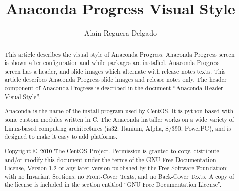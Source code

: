 \documentclass[12pt]{article}
\title{Anaconda Progress Visual Style}
\author{Alain Reguera Delgado}
\begin{document}
\maketitle

\begin{abstract}

This article describes the visual style of Anaconda Progress.
Anaconda Progress screen is shown after configuration and while
packages are installed. Anaconda Progress screen has a header, and
slide images which alternate with release notes texts.  This article
describes Anaconda Progress slide images and release notes only.  The
header component of Anaconda Progress is described in the document
``Anaconda Header Visual Style''.

Anaconda is the name of the install program used by CentOS.  It is
python-based with some custom modules written in C. The Anaconda
installer works on a wide variety of Linux-based computing
architectures (ia32, Itanium, Alpha, S/390, PowerPC), and is designed
to make it easy to add platforms.

Copyright \copyright\ 2010 The CentOS Project. Permission is granted
to copy, distribute and/or modify this document under the terms of the
GNU Free Documentation License, Version 1.2 or any later version
published by the Free Software Foundation; with no Invariant Sections,
no Front-Cover Texts, and no Back-Cover Texts. A copy of the license
is included in the section entitled ``GNU Free Documentation
License''.  

\end{abstract}

\tableofcontents








\end{document}
